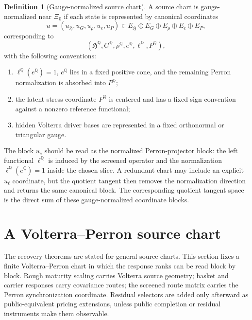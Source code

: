 \documentclass[11pt,a4paper]{amsart}
\theoremstyle{plain}
\theoremstyle{definition}
\newtheorem{definition}[theorem]{Definition}
\theoremstyle{remark}
\newcommand{\QQ}{\mathbb{Q}}
\begin{document}
\begin{definition}[Gauge-normalized source chart]\label{def:gauge-normalized-chart}
A source chart is gauge-normalized near \(\Xi_0\) if each state is represented by canonical
coordinates
\[
        u
        =
        (u_{\mathfrak H},u_G,u_\rho,u_e,u_P)
        \in
        E_{\mathfrak H}\oplus E_G\oplus E_\rho\oplus E_e\oplus E_P,
\]
corresponding to
\[
        (\mathfrak{H}^\QQ,G^\QQ,\rho^\QQ,e^\QQ,\ell^\QQ,P^\QQ),
\]
with the following conventions:
\begin{enumerate}[leftmargin=2em]
\item \(\ell^\QQ(e^\QQ)=1\), \(e^\QQ\) lies in a fixed positive cone, and the remaining Perron
normalization is absorbed into \(P^\QQ\);
\item the latent stress coordinate \(P^\QQ\) is centered and has a fixed sign convention against
a nonzero reference functional;
\item hidden Volterra driver bases are represented in a fixed orthonormal or triangular gauge.
\end{enumerate}
The block \(u_e\) should be read as the normalized Perron-projector block: the left functional
\(\ell^\QQ\) is induced by the screened operator and the normalization
\(\ell^\QQ(e^\QQ)=1\) inside the chosen slice.  A redundant chart may include an explicit
\(u_\ell\) coordinate, but the quotient tangent then removes the normalization direction and
returns the same canonical block.
The corresponding quotient tangent space is the direct sum of these gauge-normalized coordinate
blocks.
\end{definition}

\section{A Volterra--Perron source chart}\label{sec:functional-forms}

The recovery theorems are stated for general source charts.  This section fixes a finite
Volterra--Perron chart in which the response ranks can be read block by block.  Rough maturity
scaling carries Volterra source geometry; basket and carrier responses carry covariance routes;
the screened route matrix carries the Perron synchronization coordinate.  Residual selectors are
added only afterward as public-equivalent pricing extensions, unless public completion or residual
instruments make them observable.
\end{document}
